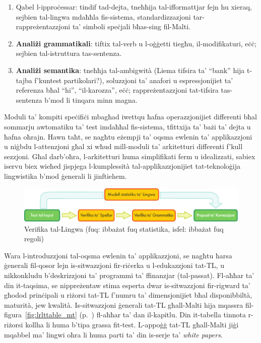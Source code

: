 \begin{multicols}{2}
\begin{enumerate}
\item Qabel l-ipproċessar: tindif tad-dejta, tneħħija tal-ifformattjar fejn hu xieraq, sejbien tal-lingwa mdaħħla fis-sistema, standardizzazjoni tar-rappreżentazzjoni ta’ simboli speċjali bħas-sing fil-Malti.
\item \textbf{Analiżi grammatikali}: tiftix tal-verb u l-oġġetti tiegħu, il-modifikaturi, eċċ;  sejbien tal-istruttura tas-sentenza.
\item \textbf{Analiżi semantika}: tneħħja tal-ambigwità (Liema tifsira ta’ “bank” hija t-tajba f’kuntest partikolari?), soluzzjoni ta’ anafori u espressjonijiet ta' referenza bħal “hi”, “il-karozza”, eċċ; rappreżentazzjoni tat-tifsira tas-sentenza b’mod li tinqara minn magna.
\end{enumerate}

Moduli ta’ kompiti speċifiċi mbagħad iwettqu ħafna operazzjonijiet differenti bħal sommarju awtomatiku ta’ test imdaħħal fis-sistema, tfittxija ta’ bażi ta' dejta u ħafna oħrajn. Hawn taħt, se nagħtu eżempji ta’ oqsma ewlenin ta’ applikazzjoni u niġbdu l-attenzjoni għal xi wħud mill-moduli ta’ arkitetturi differenti f'kull sezzjoni. Għal darb’oħra, l-arkitetturi huma simplifikati ferm u idealizzati, sabiex iservu biex wieħed jispjega l-kumplessità tal-applikazzjonijiet tat-teknoloġija lingwistika b'mod ġenerali li jinftiehem.

\begin{figure}[b]
  \center
  \includegraphics[width=\textwidth]{../_media/maltese/language_checking}
  \caption{Verifika tal-Lingwa (fuq: ibbażat fuq statistika, isfel: ibbażat fuq regoli)}
  \label{fig:langcheckingaarch_mt}
\end{figure}

Wara l-introduzzjoni tal-oqsma ewlenin ta’ applikazzjoni, se nagħtu ħarsa ġenerali fil-qosor lejn is-sitwazzjoni fir-riċerka u l-edukazzjoni tat-TL, u nikkonkludu b’deskrizzjoni ta’ programmi ta’ ffinanzjar (tal-passat). Fl-aħħar ta’ din it-taqsima, se nippreżentaw stima esperta dwar is-sitwazzjoni fir-rigward ta’ għodod prinċipali u riżorsi tat-TL f’numru ta’ dimensjonijiet bħal disponibbiltà, maturità, jew kwalità. Is-sitwazzjoni ġenerali tat-TL għall-Malti hija mqassra fil-figura~\ref{fig:lrlttable_mt} (p.~\pageref{fig:lrlttable_mt}) fl-aħħar ta' dan il-kapitlu. Din it-tabella tinnota r-riżorsi kollha li huma b’tipa grassa fit-test. L-appoġġ tat-TL għall-Malti jiġi mqabbel ma' lingwi oħra li huma parti ta' din is-serje ta' \emph{white papers}.


\end{multicols}
